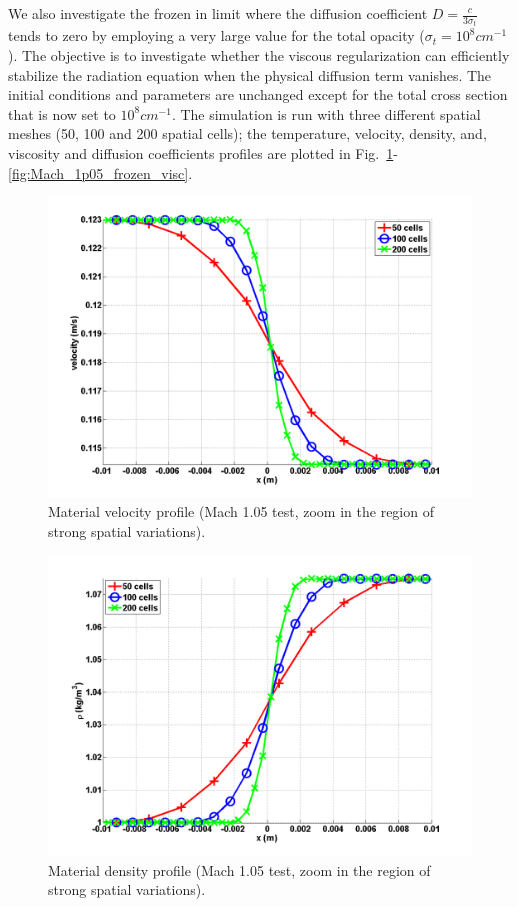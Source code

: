 \documentclass[review]{elsarticle}
\newcommand{\fig}[1]{Fig.~\ref{#1}}                      %
\begin{document}
We also investigate the frozen in limit where the diffusion coefficient $D = \frac{c}{3\sigma_t}$ tends to zero by employing a very large value for the total opacity ($\sigma_t = 10^8 cm^{-1}$). The objective is to investigate whether the viscous regularization can efficiently stabilize the radiation equation when the physical diffusion term vanishes. The initial conditions and parameters are unchanged except for the total cross section that is now set to $10^8 cm^{-1}$. The simulation is run with three different spatial meshes (50, 100 and 200 spatial cells); the temperature, velocity, density, and, viscosity and diffusion coefficients profiles are plotted in \fig{fig:Mach_1p05_frozen_density}-\ref{fig:Mach_1p05_frozen_visc}.
%
\begin{figure}[H]
        \centering
        \includegraphics[width=\textwidth]{figs/Mach_1p05_zoom_in_velocity.png}
        \caption{Material velocity profile (Mach 1.05 test, zoom in the region of strong spatial variations).}
        \label{fig:Mach_1p05_frozen_density}
\end{figure}%
\begin{figure}[H]
            \centering
            \includegraphics[width=\textwidth]{figs/Mach_1p05_zoom_in_density.png}
            \caption{Material density profile (Mach 1.05 test, zoom in the region of strong spatial variations).}
            \label{fig:Mach_1p05_frozen_velocity}
\end{figure}
\end{document}
